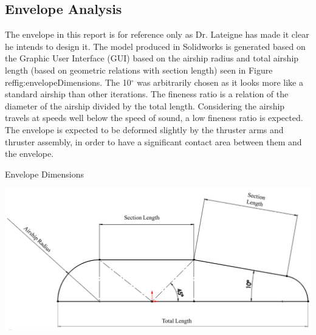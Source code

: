 \documentclass[../main.tex]{subfiles}
\begin{document}
	
\subsection{Envelope Analysis} \label{envelopeAnalysis}
The envelope in this report is for reference only as Dr. Lateigne has made it clear he intends to design it. The model produced in Solidworks is generated based on the Graphic User Interface (GUI) based on the airship radius and total airship length (based on geometric relations with section length) seen in Figure ref{fig:envelopeDimensions}. The 10$^{\circ}$ was arbitrarily chosen as it looks more like a standard airship than other iterations. The fineness ratio is a relation of the diameter of the airship divided by the total length. Considering the airship travels at speeds well below the speed of sound, a low fineness ratio is expected. The envelope is expected to be deformed slightly by the thruster arms and thruster assembly, in order to have a significant contact area between them and the envelope.

	\begin{table}[H]
	\centering
	\caption{Envelope Dimensions}
	\includegraphics[width=.4\linewidth]{img/design/envelopeDimensions.png}
	\label{fig:envelopeDimensions}
\end{table}
\end{document}
